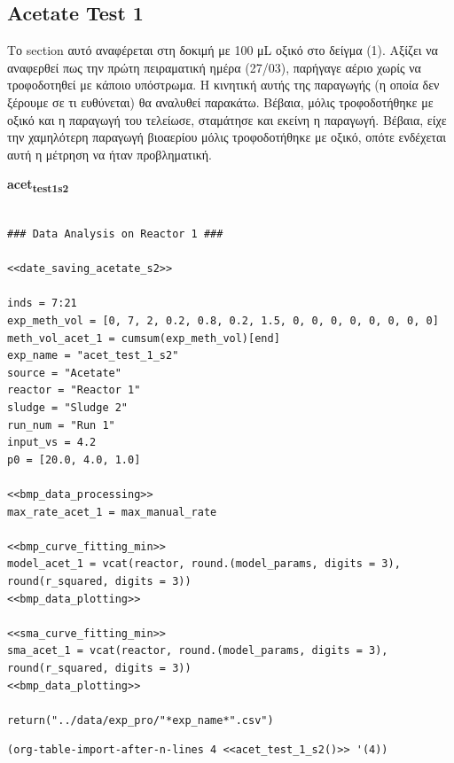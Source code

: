 \documentclass[11pt]{article}
\begin{document}
\subsection{Acetate Test 1}
\label{sec:orgbc10f73}
Το section αυτό αναφέρεται στη δοκιμή με 100 μL οξικό στο δείγμα (1). Aξίζει να αναφερθεί πως την πρώτη πειραματική ημέρα (27/03), παρήγαγε αέριο χωρίς να τροφοδοτηθεί με κάποιο υπόστρωμα. Η κινητική αυτής της παραγωγής (η οποία δεν ξέρουμε σε τι ευθύνεται) θα αναλυθεί παρακάτω. Βέβαια, μόλις τροφοδοτήθηκε με οξικό και η παραγωγή του τελείωσε, σταμάτησε και εκείνη η παραγωγή. Βέβαια, είχε την χαμηλότερη παραγωγή βιοαερίου μόλις τροφοδοτήθηκε με οξικό, οπότε ενδέχεται αυτή η μέτρηση να ήταν προβληματική.

\textbf{acet\textsubscript{test}\textsubscript{1}\textsubscript{s2}}
\begin{verbatim}

### Data Analysis on Reactor 1 ###

<<date_saving_acetate_s2>>

inds = 7:21
exp_meth_vol = [0, 7, 2, 0.2, 0.8, 0.2, 1.5, 0, 0, 0, 0, 0, 0, 0, 0]
meth_vol_acet_1 = cumsum(exp_meth_vol)[end]
exp_name = "acet_test_1_s2"
source = "Acetate"
reactor = "Reactor 1"
sludge = "Sludge 2"
run_num = "Run 1"
input_vs = 4.2
p0 = [20.0, 4.0, 1.0]

<<bmp_data_processing>>
max_rate_acet_1 = max_manual_rate

<<bmp_curve_fitting_min>>
model_acet_1 = vcat(reactor, round.(model_params, digits = 3), round(r_squared, digits = 3))
<<bmp_data_plotting>>

<<sma_curve_fitting_min>>
sma_acet_1 = vcat(reactor, round.(model_params, digits = 3), round(r_squared, digits = 3))  
<<bmp_data_plotting>>

return("../data/exp_pro/"*exp_name*".csv")
\end{verbatim}

\begin{verbatim}
(org-table-import-after-n-lines 4 <<acet_test_1_s2()>> '(4))
\end{verbatim}
\end{document}
